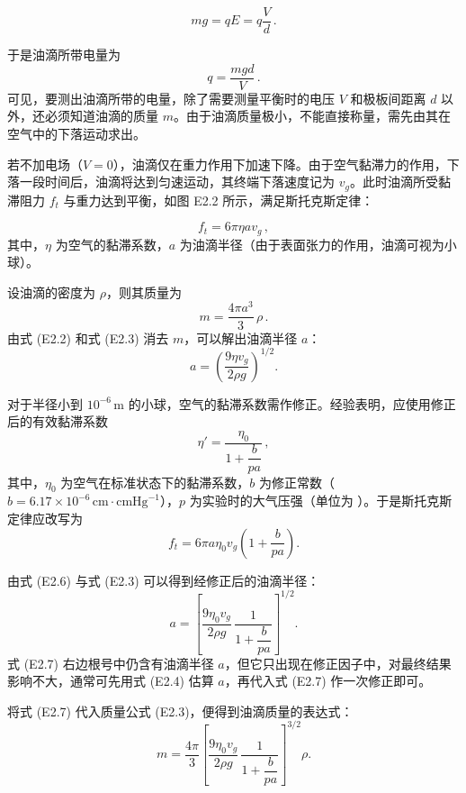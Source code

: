 \documentclass[a4paper,8pt,twocolumn]{article}
\begin{document}
\begin{equation}
mg = qE = q\frac{V}{d} \,.
\tag{E2.1}
\end{equation}

于是油滴所带电量为
\[
q = \frac{mgd}{V} \,.
\]
可见，要测出油滴所带的电量，除了需要测量平衡时的电压 $V$ 和极板间距离 $d$ 以外，还必须知道油滴的质量 $m$。由于油滴质量极小，不能直接称量，需先由其在空气中的下落运动求出。

若不加电场（$V = 0$），油滴仅在重力作用下加速下降。由于空气黏滞力的作用，下落一段时间后，油滴将达到匀速运动，其终端下落速度记为 $v_g$。此时油滴所受黏滞阻力 $f_t$ 与重力达到平衡，如图 E2.2 所示，满足斯托克斯定律：

\begin{equation}
f_t = 6\pi\eta a v_g \,,
\tag{E2.2}
\end{equation}
其中，$\eta$ 为空气的黏滞系数，$a$ 为油滴半径（由于表面张力的作用，油滴可视为小球）。

设油滴的密度为 $\rho$，则其质量为
\begin{equation}
m = \frac{4\pi a^3}{3}\,\rho \,.
\tag{E2.3}
\end{equation}
由式 (E2.2) 和式 (E2.3) 消去 $m$，可以解出油滴半径 $a$：
\begin{equation}
a = \left( \frac{9\eta v_g}{2\rho g} \right)^{1/2}.
\tag{E2.4}
\end{equation}

对于半径小到 $10^{-6}\,\text{m}$ 的小球，空气的黏滞系数需作修正。经验表明，应使用修正后的有效黏滞系数
\begin{equation}
\eta' = \frac{\eta_0}{1 + \dfrac{b}{pa}} \,,
\tag{E2.5}
\end{equation}
其中，$\eta_0$ 为空气在标准状态下的黏滞系数，$b$ 为修正常数（$b = 6.17\times10^{-6}\,\text{cm}\cdot\text{cmHg}^{-1}$），$p$ 为实验时的大气压强（单位为 ）。于是斯托克斯定律应改写为
\begin{equation}
f_t = 6\pi a \eta_0 v_g \left(1 + \frac{b}{pa}\right).
\tag{E2.6}
\end{equation}

由式 (E2.6) 与式 (E2.3) 可以得到经修正后的油滴半径：
\begin{equation}
a = \left[
      \frac{9\eta_0 v_g}{2\rho g}\,
      \frac{1}{1 + \dfrac{b}{pa}}
    \right]^{1/2}.
\tag{E2.7}
\end{equation}
式 (E2.7) 右边根号中仍含有油滴半径 $a$，但它只出现在修正因子中，对最终结果影响不大，通常可先用式 (E2.4) 估算 $a$，再代入式 (E2.7) 作一次修正即可。

将式 (E2.7) 代入质量公式 (E2.3)，便得到油滴质量的表达式：
\begin{equation}
m = \frac{4\pi}{3}
\left[
  \frac{9\eta_0 v_g}{2\rho g}\,
  \frac{1}{1 + \dfrac{b}{pa}}
\right]^{3/2} \rho .
\tag{E2.8}
\end{equation}
\end{document}
